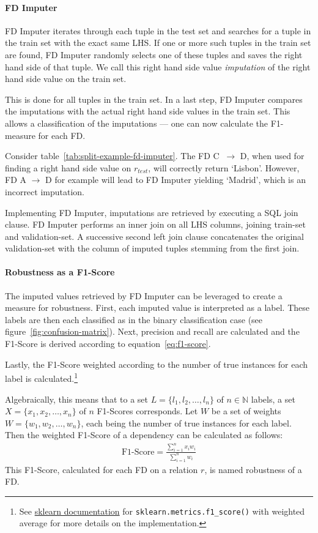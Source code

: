 \paragraph{FD Imputer} FD Imputer iterates through each tuple in the test set and searches for a tuple in the train set with the exact same LHS.
If one or more such tuples in the train set are found, FD Imputer randomly selects one of these tuples and saves the right hand side of that tuple.
We call this right hand side value \emph{imputation} of the right hand side value on the train set.

This is done for all tuples in the train set.
In a last step, FD Imputer compares the imputations with the actual right hand side values in the train set.
This allows a classification of the imputations --- one can now calculate the F1-measure for each FD.

Consider table~\ref{tab:split-example-fd-imputer}.
The FD \textsc{C} \( \ \to \) \textsc{D}, when used for finding a right hand side value on \( r_{test} \), will correctly return `Lisbon'.
However, FD \textsc{A} \( \to \) \textsc{D} for example will lead to FD Imputer yielding `Madrid', which is an incorrect imputation.

Implementing FD Imputer, imputations are retrieved by executing a SQL join clause.
FD Imputer performs an inner join on all LHS columns, joining train-set and validation-set.
A successive second left join clause concatenates the original validation-set with the column of imputed tuples stemming from the first join.

\paragraph{Robustness as a F1-Score} The imputed values retrieved by FD Imputer can be leveraged to create a measure for robustness.
First, each imputed value is interpreted as a label.
These labels are then each classified as in the binary classification case (see figure~\ref{fig:confusion-matrix}).
Next, precision and recall are calculated and the F1-Score is derived according to equation~\ref{eq:f1-score}.

Lastly, the F1-Score weighted according to the number of true instances for each label is calculated.\footnote{See \href{https://scikit-learn.org/stable/modules/generated/sklearn.metrics.f1_score.html}{sklearn documentation} for \texttt{sklearn.metrics.f1\_score()} with weighted average for more details on the implementation.}

Algebraically, this means that to a set \( L = \{ l_1, l_2, \dots, l_n \} \) of \( n \in \mathbb{N} \) labels, a set \( X = \{ x_1, x_2, \dots, x_n \}\) of \( n \) F1-Scores corresponds.
Let \( W \) be a set of weights \( W = \{ w_1, w_2, \dots, w_n \} \), each being the number of true instances for each label.
Then the weighted F1-Score of a dependency can be calculated as follows:
\begin{align}
    \text{F1-Score} = \frac{\sum_{i=1}^{n} x_i w_i}{\sum_{i=1}^{n}w_i}
\end{align}
This F1-Score, calculated for each FD on a relation \( r \), is named robustness of a FD.

